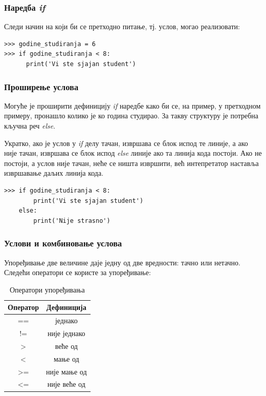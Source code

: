 \subsubsection{Наредба \emph{if}}

Следи начин на који би се претходно питање, тј. услов, могао реализовати:

\begin{lstlisting}[caption = Пример услова, label = if]
>>> godine_studiranja = 6
>>> if godine_studiranja < 8:
      print('Vi ste sjajan student')
\end{lstlisting}

\subsubsection{Проширење услова}

Могуће је проширити дефиницију \emph{if} наредбе како би се, на пример, у претходном примеру, пронашло колико је ко година студирао. За такву структуру је потребна кључна реч \emph{else}.

Укратко, ако је услов у \emph{if} делу тачан, извршава се блок испод те линије, а ако није тачан, извршава се блок испод \emph{else} линије ако та линија кода постоји. Ако не постоји, а услов није тачан, неће се ништа извршити, већ интепретатор наставља извршавање даљих линија кода.

\begin{lstlisting}[caption = Пример за наредбе IF - ELSE, label = ifelse]
>>> if godine_studiranja < 8:
        print('Vi ste sjajan student')
    else:
        print('Nije strasno')
\end{lstlisting}

\subsubsection{Услови и комбиновање услова}

Упоређивање две величине даје једну од две вредности: тачно или нетачно. Следећи оператори се користе за упоређивање:

\begin{table}[here]
\centering
\begin{tabular}{|c|c|} \hline
\textbf{Оператор} & \textbf{Дефиниција} \\ \hline \hline
== & једнако \\ \hline
!= & није једнако \\ \hline
> & веће од  \\ \hline
< & мање од \\ \hline
>= & није мање од \\ \hline
<= & није веће од \\ \hline
\end{tabular}\medskip
\caption{Оператори упоређивања}
\label{tabele:opporedjenja}
\end{table}

